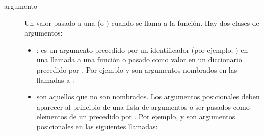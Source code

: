 \documentclass[a4,10pt,spanish]{sphinxmanual}
\begin{document}
\begin{description}
\item[{argumento\label{\detokenize{glossary:term-argument}}}] \leavevmode
\sphinxAtStartPar
Un valor pasado a una {\hyperref[\detokenize{glossary:term-function}]{}} (o {\hyperref[\detokenize{glossary:term-method}]{}}) cuando se llama a la función. Hay dos clases de argumentos:
\begin{itemize}
\item {} 
\sphinxAtStartPar
{}: es un argumento precedido por un identificador (por ejemplo, ) en una llamada a una función o pasado como valor en un diccionario precedido por \sphinxcode{\sphinxupquote{**}}. Por ejemplo  y  son argumentos nombrados en las llamadas a :

\begin{sphinxVerbatim}[commandchars=\\\{\}]
 
   
\end{sphinxVerbatim}

\item {} 
\sphinxAtStartPar
{} son aquellos que no son nombrados. Los argumentos posicionales deben aparecer al principio de una lista de argumentos o ser pasados como elementos de un {\hyperref[\detokenize{glossary:term-iterable}]{}} precedido por \sphinxcode{\sphinxupquote{*}}. Por ejemplo,  y  son argumentos posicionales en las siguientes llamadas:

\begin{sphinxVerbatim}[commandchars=\\\{\}]
 
 
\end{sphinxVerbatim}


\end{itemize}
\end{description}
\end{document}
